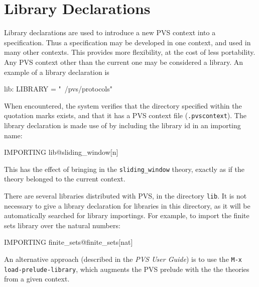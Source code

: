 \section{Library Declarations}
\label{library-decls}

Library declarations are used to introduce a new PVS context into a
specification.  Thus a specification may be developed in one context, and
used in many other contexts.  This provides more flexibility, at the cost
of less portability.  Any PVS context other than the current one may be
considered a library.  An example of a library declaration
is
\begin{pvsex}
  lib: LIBRARY = "~/pvs/protocols"
\end{pvsex}
When encountered, the system verifies that the directory specified within
the quotation marks exists, and that it has a PVS context file
%
(\texttt{.pvscontext}).  The library declaration is made use of by
including the library id in an importing name:
\begin{pvsex}
  IMPORTING lib@sliding_window[n]
\end{pvsex}
This has the effect of bringing in the \texttt{sliding\_window} theory,
exactly as if the theory belonged to the current context.

There are several libraries distributed with PVS, in the directory {\tt lib}.
It is not necessary to give a library declaration for libraries in this
directory, as it will be automatically searched for library importings.
For example, to import the finite sets library over the natural numbers:
\begin{pvsex}
  IMPORTING finite\_sets@finite\_sets[nat]
\end{pvsex}
An alternative approach (described in the \emph{PVS User
Guide}\cite{PVS:userguide}) is to use the {\tt M-x load-prelude-library},
which augments the PVS prelude with the the theories from a given context.


